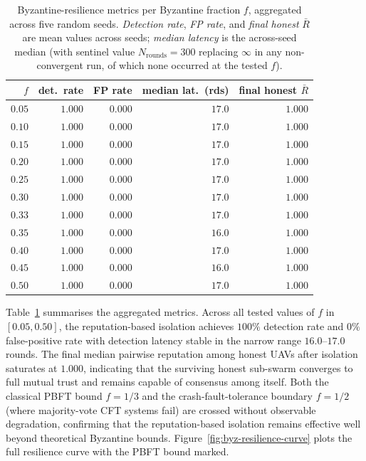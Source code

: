 \documentclass[journal,10pt,twocolumn]{IEEEtran}
\begin{document}
\begin{table}[t]
  \centering
  \caption{Byzantine-resilience metrics per Byzantine fraction $f$,
    aggregated across five random seeds.
    \emph{Detection rate}, \emph{FP rate}, and \emph{final honest}
    $\bar{R}$ are mean values across seeds;
    \emph{median latency} is the across-seed median (with sentinel
    value $N_\text{rounds}{=}300$ replacing $\infty$ in any
    non-convergent run, of which none occurred at the tested $f$).}
  \label{tab:byz-resilience}
  \begin{tabular}{rrrrr}
    \toprule
    $f$ & det.\ rate & FP rate & median lat.\ (rds) & final honest $\bar{R}$ \\
    \midrule
    $0.05$ & $1.000$ & $0.000$ & $17.0$ & $1.000$ \\
    $0.10$ & $1.000$ & $0.000$ & $17.0$ & $1.000$ \\
    $0.15$ & $1.000$ & $0.000$ & $17.0$ & $1.000$ \\
    $0.20$ & $1.000$ & $0.000$ & $17.0$ & $1.000$ \\
    $0.25$ & $1.000$ & $0.000$ & $17.0$ & $1.000$ \\
    $0.30$ & $1.000$ & $0.000$ & $17.0$ & $1.000$ \\
    $0.33$ & $1.000$ & $0.000$ & $17.0$ & $1.000$ \\
    $0.35$ & $1.000$ & $0.000$ & $16.0$ & $1.000$ \\
    $0.40$ & $1.000$ & $0.000$ & $17.0$ & $1.000$ \\
    $0.45$ & $1.000$ & $0.000$ & $16.0$ & $1.000$ \\
    $0.50$ & $1.000$ & $0.000$ & $17.0$ & $1.000$ \\
    \bottomrule
  \end{tabular}
\end{table}

Table~\ref{tab:byz-resilience} summarises the aggregated metrics.
Across all tested values of $f$ in $[0.05, 0.50]$, the reputation-based
isolation achieves $100\%$ detection rate and $0\%$ false-positive rate
with detection latency stable in the narrow range $16.0$--$17.0$ rounds.
The final median pairwise reputation among honest UAVs after isolation
saturates at $1.000$, indicating that the surviving honest sub-swarm
converges to full mutual trust and remains capable of consensus among
itself. Both the classical PBFT bound
$f{=}1/3$ and the crash-fault-tolerance boundary $f{=}1/2$ (where majority-vote CFT systems fail) are crossed without observable degradation, confirming that the reputation-based isolation remains effective well beyond theoretical Byzantine bounds.
Figure~\ref{fig:byz-resilience-curve} plots the full resilience curve
with the PBFT bound marked.
\end{document}
